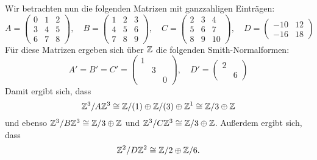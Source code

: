 \documentclass[a4paper,10pt,numbers=noenddot]{scrartcl}
\begin{document}
Wir betrachten nun die folgenden Matrizen mit ganzzahligen Einträgen:
\[
    A
  = \begin{pmatrix}
      0 & 1 & 2 \\
      3 & 4 & 5 \\
      6 & 7 & 8
    \end{pmatrix},
  \quad
    B
  = \begin{pmatrix}
      1 & 2 & 3 \\
      4 & 5 & 6 \\
      7 & 8 & 9
    \end{pmatrix},
  \quad
    C
  = \begin{pmatrix}
      2 & 3 &  4  \\
      5 & 6 &  7  \\
      8 & 9 & 10
    \end{pmatrix},
  \quad
    D
  = \begin{pmatrix}
      -10 & 12  \\
      -16 & 18
    \end{pmatrix}
\]
Für diese Matrizen ergeben sich über $\mathbb{Z}$ die folgenden Smith-Normalformen:
\[
    A'
  = B'
  = C'
  = \begin{pmatrix}
      1 &   &   \\
        & 3 &   \\
        &   & 0
    \end{pmatrix},
  \quad
    D'
  = \begin{pmatrix}
      2 &    \\
        & 6
    \end{pmatrix}
\]
Damit ergibt sich, dass
\[
        \mathbb{Z}^3 / A \mathbb{Z}^3
  \cong \mathbb{Z}/(1) \oplus \mathbb{Z}/(3) \oplus \mathbb{Z}^1
  \cong \mathbb{Z}/3 \oplus \mathbb{Z}
\]
und ebenso $\mathbb{Z}^3 / B \mathbb{Z}^3 \cong \mathbb{Z}/3 \oplus \mathbb{Z}$ und $\mathbb{Z}^3 / C \mathbb{Z}^3 \cong \mathbb{Z}/3 \oplus \mathbb{Z}$.
Außerdem ergibt sich, dass
\[
        \mathbb{Z}^2 / D \mathbb{Z}^2
  \cong \mathbb{Z}/2 \oplus \mathbb{Z}/6.
\]
\end{document}
